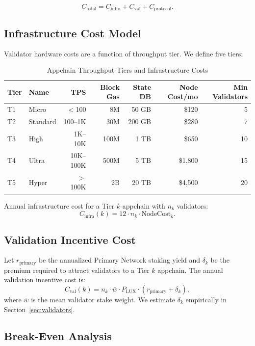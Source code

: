 \documentclass[11pt]{article}
\begin{document}
\[
  C_{\text{total}} = C_{\text{infra}} + C_{\text{val}} + C_{\text{protocol}}.
\]

\subsection{Infrastructure Cost Model}

Validator hardware costs are a function of throughput tier. We define five tiers:

\begin{table}[H]
\centering
\caption{Appchain Throughput Tiers and Infrastructure Costs}
\label{tab:tiers}
\begin{tabular}{llrrrrr}
\toprule
\textbf{Tier} & \textbf{Name} & \textbf{TPS} & \textbf{Block Gas} & \textbf{State DB} & \textbf{Node Cost/mo} & \textbf{Min Validators} \\
\midrule
T1 & Micro & $<$100 & 8M & 50 GB & \$120 & 5 \\
T2 & Standard & 100--1K & 30M & 200 GB & \$280 & 7 \\
T3 & High & 1K--10K & 100M & 1 TB & \$650 & 10 \\
T4 & Ultra & 10K--100K & 500M & 5 TB & \$1,800 & 15 \\
T5 & Hyper & $>$100K & 2B & 20 TB & \$4,500 & 20 \\
\bottomrule
\end{tabular}
\end{table}

Annual infrastructure cost for a Tier $k$ appchain with $n_k$ validators:
\[
  C_{\text{infra}}(k) = 12 \cdot n_k \cdot \text{NodeCost}_k.
\]

\subsection{Validation Incentive Cost}

Let $r_{\text{primary}}$ be the annualized Primary Network staking yield and $\delta_k$
be the premium required to attract validators to a Tier $k$ appchain. The annual
validation incentive cost is:
\[
  C_{\text{val}}(k) = n_k \cdot \bar{w} \cdot P_{\text{LUX}} \cdot (r_{\text{primary}} + \delta_k),
\]
where $\bar{w}$ is the mean validator stake weight. We estimate $\delta_k$ empirically
in Section~\ref{sec:validators}.

\subsection{Break-Even Analysis}
\end{document}
